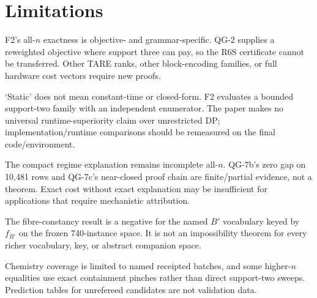 \section{Limitations}

F2's all-$n$ exactness is objective- and grammar-specific. QG-2 supplies a reweighted objective where support three can pay, so the R6S certificate cannot be transferred. Other TARE ranks, other block-encoding families, or full hardware cost vectors require new proofs.

`Static' does not mean constant-time or closed-form. F2 evaluates a bounded support-two family with an independent enumerator. The paper makes no universal runtime-superiority claim over unrestricted DP; implementation/runtime comparisons should be remeasured on the final code/environment.

The compact regime explanation remains incomplete all-$n$. QG-7b's zero gap on 10,481 rows and QG-7c's near-closed proof chain are finite/partial evidence, not a theorem. Exact cost without exact explanation may be insufficient for applications that require mechanistic attribution.

The fibre-constancy result is a negative for the named $B'$ vocabulary keyed by
$f_{B'}$ on the frozen 740-instance space. It is not an impossibility theorem
for every richer vocabulary, key, or abstract companion space.

Chemistry coverage is limited to named receipted batches, and some higher-$n$ equalities use exact containment pinches rather than direct support-two sweeps. Prediction tables for unrefereed candidates are not validation data.

